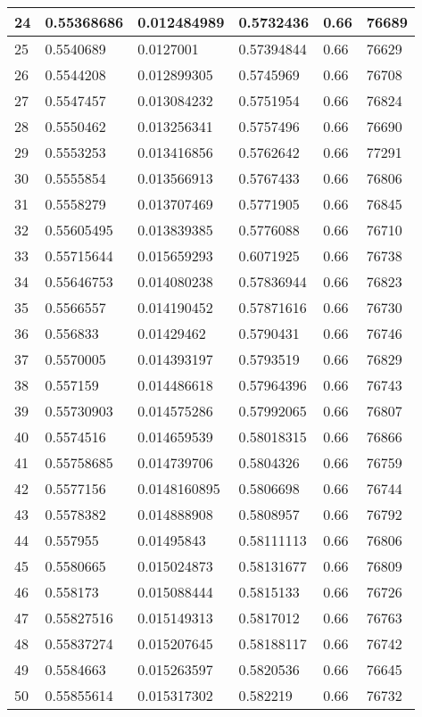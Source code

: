 \begin{longtable}{|l|l|l|l|l|l|}
24 & 0.55368686 & 0.012484989 & 0.5732436 & 0.66 & 76689 \\ \hline 
25 & 0.5540689 & 0.0127001 & 0.57394844 & 0.66 & 76629 \\ \hline 
26 & 0.5544208 & 0.012899305 & 0.5745969 & 0.66 & 76708 \\ \hline 
27 & 0.5547457 & 0.013084232 & 0.5751954 & 0.66 & 76824 \\ \hline 
28 & 0.5550462 & 0.013256341 & 0.5757496 & 0.66 & 76690 \\ \hline 
29 & 0.5553253 & 0.013416856 & 0.5762642 & 0.66 & 77291 \\ \hline 
30 & 0.5555854 & 0.013566913 & 0.5767433 & 0.66 & 76806 \\ \hline 
31 & 0.5558279 & 0.013707469 & 0.5771905 & 0.66 & 76845 \\ \hline 
32 & 0.55605495 & 0.013839385 & 0.5776088 & 0.66 & 76710 \\ \hline 
33 & 0.55715644 & 0.015659293 & 0.6071925 & 0.66 & 76738 \\ \hline 
34 & 0.55646753 & 0.014080238 & 0.57836944 & 0.66 & 76823 \\ \hline 
35 & 0.5566557 & 0.014190452 & 0.57871616 & 0.66 & 76730 \\ \hline 
36 & 0.556833 & 0.01429462 & 0.5790431 & 0.66 & 76746 \\ \hline 
37 & 0.5570005 & 0.014393197 & 0.5793519 & 0.66 & 76829 \\ \hline 
38 & 0.557159 & 0.014486618 & 0.57964396 & 0.66 & 76743 \\ \hline 
39 & 0.55730903 & 0.014575286 & 0.57992065 & 0.66 & 76807 \\ \hline 
40 & 0.5574516 & 0.014659539 & 0.58018315 & 0.66 & 76866 \\ \hline 
41 & 0.55758685 & 0.014739706 & 0.5804326 & 0.66 & 76759 \\ \hline 
42 & 0.5577156 & 0.0148160895 & 0.5806698 & 0.66 & 76744 \\ \hline 
43 & 0.5578382 & 0.014888908 & 0.5808957 & 0.66 & 76792 \\ \hline 
44 & 0.557955 & 0.01495843 & 0.58111113 & 0.66 & 76806 \\ \hline 
45 & 0.5580665 & 0.015024873 & 0.58131677 & 0.66 & 76809 \\ \hline 
46 & 0.558173 & 0.015088444 & 0.5815133 & 0.66 & 76726 \\ \hline 
47 & 0.55827516 & 0.015149313 & 0.5817012 & 0.66 & 76763 \\ \hline 
48 & 0.55837274 & 0.015207645 & 0.58188117 & 0.66 & 76742 \\ \hline 
49 & 0.5584663 & 0.015263597 & 0.5820536 & 0.66 & 76645 \\ \hline 
50 & 0.55855614 & 0.015317302 & 0.582219 & 0.66 & 76732 \\ \hline 
\end{longtable}